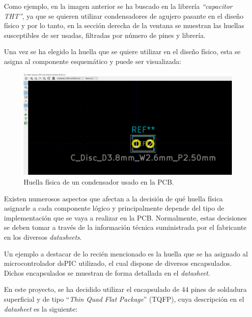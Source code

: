 Como ejemplo, en la imagen anterior se ha buscado en la librería \textit{``capacitor \ac{THT}''}, ya que se quieren utilizar condensadores de agujero pasante en el diseño físico y por lo tanto, en la sección derecha de la ventana se muestran las huellas susceptibles de ser usadas, filtradas por número de pines y librería.

Una vez se ha elegido la huella que se quiere utilizar en el diseño físico, esta se asigna al componente esquemático y puede ser visualizada:


\begin{figure}[H]
\centering 
\includegraphics[width=\linewidth]{pictures/huellaCondensador.PNG}
\caption{Huella física  de un condensador usado en la \ac{PCB}.}
\label{fig:CAMBIAR!!!!!!!!!!}
\end{figure}

Existen numerosos aspectos que afectan a la decisión de qué huella física asignarle a cada componente lógico y principalmente depende del tipo de implementación que se vaya a realizar en la \ac{PCB}. Normalmente, estas decisiones se deben tomar a través de la información técnica suministrada por el fabricante en los diversos \textit{datasheets}.

Un ejemplo a destacar de lo recién mencionado es la huella que se ha asignado al microcontrolador dsPIC utilizado, el cual dispone de diversos encapsulados. Dichos encapsulados se muestran de forma detallada en el \textit{datasheet}.

En este proyecto, se ha decidido utilizar el encapsulado de 44 pines de soldadura superficial y de tipo ``\textit{Thin Quad Flat Package}'' (TQFP), cuya descripción en el \textit{datasheet} es la siguiente:

